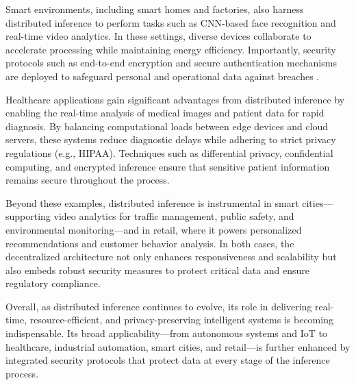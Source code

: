 \documentclass[conference]{IEEEtran}
\begin{document}
Smart environments, including smart homes and factories, also harness distributed inference to perform tasks such as CNN-based face recognition and real-time video analytics. In these settings, diverse devices collaborate to accelerate processing while maintaining energy efficiency. Importantly, security protocols such as end-to-end encryption and secure authentication mechanisms are deployed to safeguard personal and operational data against breaches \cite{zeng2020coedge}.


Healthcare applications gain significant advantages from distributed inference by enabling the real-time analysis of medical images and patient data for rapid diagnosis. By balancing computational loads between edge devices and cloud servers, these systems reduce diagnostic delays while adhering to strict privacy regulations (e.g., HIPAA). Techniques such as differential privacy, confidential computing, and encrypted inference ensure that sensitive patient information remains secure throughout the process.

Beyond these examples, distributed inference is instrumental in smart cities—supporting video analytics for traffic management, public safety, and environmental monitoring—and in retail, where it powers personalized recommendations and customer behavior analysis. In both cases, the decentralized architecture not only enhances responsiveness and scalability but also embeds robust security measures to protect critical data and ensure regulatory compliance.

Overall, as distributed inference continues to evolve, its role in delivering real-time, resource-efficient, and privacy-preserving intelligent systems is becoming indispensable. Its broad applicability—from autonomous systems and IoT to healthcare, industrial automation, smart cities, and retail—is further enhanced by integrated security protocols that protect data at every stage of the inference process.

\end{document}
